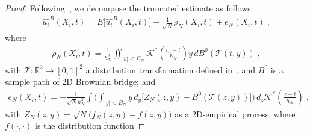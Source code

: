 \documentclass[a4paper,11pt]{article}
\begin{document}
\begin{proof}
Following~\cite{mack1982weak}, we decompose the truncated estimate as follows:
\begin{align*}
\widehat{u_t}^B(X_i,t)=E	\Big[\widehat{u_t}^B(X_i,t)\Big]+\frac{1}{\sqrt{N}}\rho_N(X_i,t)+e_N(X_i,t)\;,
\end{align*}
where
\begin{align}
\rho_N(X_i,t)=\frac{1}{h_N^2}\iint_{|y|<B_N}	\mathcal{K}^*(\frac{t_n-t}{h_N})y\,dB^0(\mathcal{T}(t,y))\;,\label{eq.rhoterm}
\end{align}
with $\mathcal{T}:\mathbb{R}^2\to [0,1]^2$ a distribution transformation defined in~\cite{rosenblatt1952remarks}, and $B^0$ is a sample path of 2D Brownian bridge; and
\begin{align}
e_N(X_i,t)=-\frac{1}{\sqrt{N}h_N^2}\int\Big(\int_{|y|<B_N}y\,d_y\big[Z_N(z,y)-B^0(\mathcal{T}(z,y))\big]\Big)\,d_z \mathcal{K}^*(\frac{z-t}{h_N})\;.	\label{eq.eterm}
\end{align}
with $Z_N(z,y) = \sqrt{N}\big(f_N(z,y)-f(z,y)\big)$ as a 2D-empirical process, where $f(\cdot,\cdot)$ is the distribution function


\end{proof}
\end{document}
